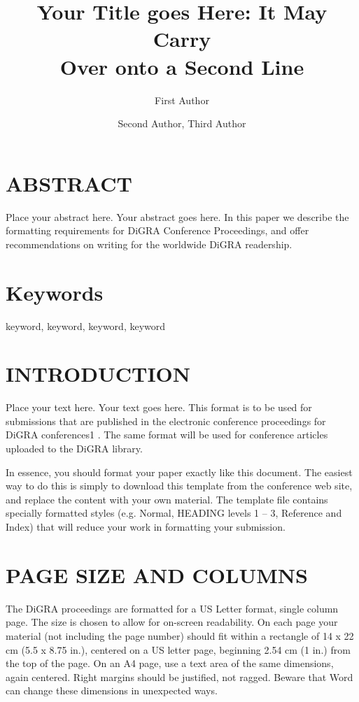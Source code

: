\documentclass[11pt]{article}
\title{\addvspace{-2\baselineskip}Your Title goes Here: It May Carry \\
Over onto a Second Line}
\author{First Author}
\affil{Institutional Affiliation \\
Address line 1 \\
Address line 2 \\
telephone \\
firstauthor@institution.com }
\author{Second Author, Third Author}
\affil{Institutional Affiliation \\
Address line 1 \\
Address line 2 \\
telephone \\
secondauthor@institution.com, thirdauthor@institution.com}
\date{\vspace{-60pt}}
\begin{document}
\newpage
{}  
   \maketitle
    \copyrightnotice
    
   \section*{ABSTRACT}
   
Place your abstract here. Your abstract goes here. In this paper we describe the formatting
requirements for DiGRA Conference Proceedings, and offer recommendations on writing
for the worldwide DiGRA readership.
\section*{Keywords}
keyword, keyword, keyword, keyword

\section*{INTRODUCTION}

Place your text here. Your text goes here. This format is to be used for submissions that
are published in the electronic conference proceedings for DiGRA conferences1
. The
same format will be used for conference articles uploaded to the DiGRA library.

In essence, you should format your paper exactly like this document. The easiest way to
do this is simply to download this template from the conference web site, and replace the
content with your own material. The template file contains specially formatted styles (e.g.
Normal, HEADING levels 1 – 3, Reference and Index) that will reduce your work in
formatting your submission.
\section*{PAGE SIZE AND COLUMNS}
The DiGRA proceedings are formatted for a US Letter format, single column page. The
size is chosen to allow for on-screen readability. On each page your material (not
including the page number) should fit within a rectangle of 14 x 22 cm (5.5 x 8.75 in.),
centered on a US letter page, beginning 2.54 cm (1 in.) from the top of the page. On an
A4 page, use a text area of the same dimensions, again centered. Right margins should be
justified, not ragged. Beware that Word can change these dimensions in unexpected
ways.
\end{document}
